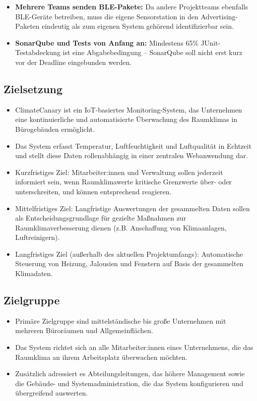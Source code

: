 \documentclass[12pt,a4paper]{article}
\begin{document}
\begin{itemize}
	\item \textbf{Mehrere Teams senden BLE-Pakete:} Da andere Projektteams ebenfalls
	BLE-Geräte betreiben, muss die eigene Sensorstation in den Advertising-Paketen
	eindeutig als zum eigenen System gehörend identifizierbar sein.
	
	\item \textbf{SonarQube und Tests von Anfang an:} Mindestens 65\% JUnit-Testabdeckung
	ist eine Abgabebedingung -- SonarQube soll nicht erst kurz vor der Deadline
	eingebunden werden.
\end{itemize}

\subsection{Zielsetzung}
\begin{itemize}
	\item ClimateCanary ist ein IoT-basiertes Monitoring-System, das Unternehmen eine kontinuierliche und automatisierte Überwachung des Raumklimas in Bürogebäuden ermöglicht.
	\item Das System erfasst Temperatur, Luftfeuchtigkeit und Luftqualität in Echtzeit und stellt diese Daten rollenabhängig in einer zentralen Webanwendung dar.
	\item Kurzfristiges Ziel: Mitarbeiter:innen und Verwaltung sollen jederzeit informiert sein, wenn Raumklimawerte kritische Grenzwerte über- oder unterschreiten, und können entsprechend reagieren.
	\item Mittelfristiges Ziel: Langfristige Auswertungen der gesammelten Daten sollen als Entscheidungsgrundlage für gezielte Maßnahmen zur Raumklimaverbesserung dienen (z.B. Anschaffung von Klimaanlagen, Luftreinigern).
	\item Langfristiges Ziel (außerhalb des aktuellen Projektumfangs): Automatische Steuerung von Heizung, Jalousien und Fenstern auf Basis der gesammelten Klimadaten.
\end{itemize}

\subsection{Zielgruppe}
\begin{itemize}
	\item Primäre Zielgruppe sind mittelständische bis große Unternehmen mit mehreren Büroräumen und Allgemeinflächen.
	\item Das System richtet sich an alle Mitarbeiter:innen eines Unternehmens, die das Raumklima an ihrem Arbeitsplatz überwachen möchten.
	\item Zusätzlich adressiert es Abteilungsleitungen, das höhere Management sowie die Gebäude- und Systemadministration, die das System konfigurieren und übergreifend auswerten.
\end{itemize}
\end{document}
